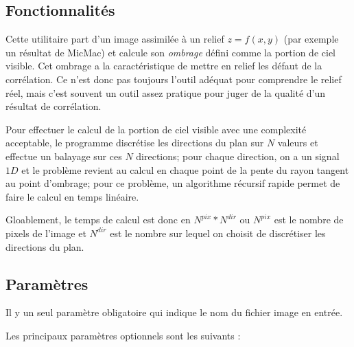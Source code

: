 \subsection{Fonctionnalit\'es}

Cette utilitaire part d'un image assimil\'ee \`a un relief
$z=f(x,y)$ (par exemple un r\'esultat de MicMac) et calcule 
son \emph{ombrage} d\'efini comme la portion de ciel visible.
Cet ombrage a la caract\'eristique de mettre en relief
les d\'efaut de la corr\'elation. Ce n'est donc
pas toujours l'outil ad\'equat pour comprendre
le relief r\'eel, mais c'est souvent un outil assez pratique
pour juger de la qualit\'e d'un r\'esultat de corr\'elation.

Pour effectuer le calcul de la portion de ciel visible avec
une complexit\'e acceptable, le programme  discr\'etise
les directions du plan sur $N$ valeurs et effectue un balayage
sur ces $N$ directions; pour chaque direction, on a un signal $1D$ 
et le probl\`eme revient au calcul en chaque point de la pente 
du rayon  tangent au  point d'ombrage; pour ce probl\`eme, un algorithme
r\'ecursif rapide permet de faire le calcul en temps lin\'eaire.

Gloablement, le temps de calcul est donc en $N^{pix}*N^{dir}$ ou
$N^{pix}$ est le nombre de pixels de l'image et $N^{dir}$ est le
nombre  sur lequel on choisit de discr\'etiser les directions
du plan.


\subsection{Param\`etres}

Il y un seul param\`etre obligatoire qui indique le nom du fichier
image en entr\'ee. 

Les principaux param\`etres optionnels sont les suivants :

